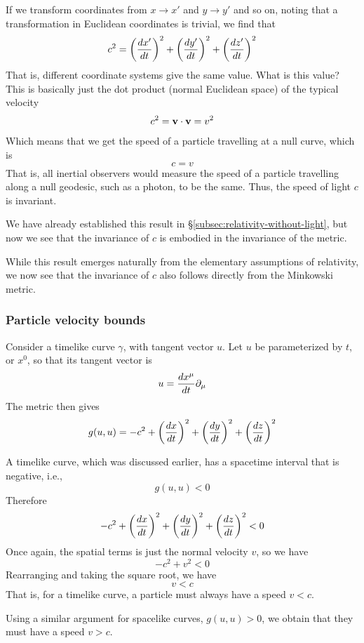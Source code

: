 		If we transform coordinates from $x\to x'$ and $y\to y'$ and so on,
		noting that a transformation in Euclidean coordinates is trivial,
		we find that
		\[
			c^2 = 
			\pqty{
				\dv{x'}{t} 
			}^2
			+
			\pqty{
				\dv{y'}{t} 
			}^2
			+
			\pqty{
				\dv{z'}{t} 
			}^2
		\]
		That is, different coordinate systems give the same value.
		What is this value?
		This is basically just the dot product (normal Euclidean space) of the typical velocity
		\[
			c^2 = \vb{v}\cdot \vb{v} = v^2
		\]
		Which means that we get the speed of a particle travelling 
		at a null curve, which is
		\[
			c = v
		\]
		That is, all inertial observers would measure the speed of a particle
		travelling along a null geodesic, such as a photon, to be the same.
		Thus, the speed of light $c$ is invariant.

		We have already established this result in \S\ref{subsec:relativity-without-light},
		but now we see that the invariance of $c$ is embodied in the invariance
		of the metric.

		While this result emerges naturally from the elementary assumptions
		of relativity, we now see that the invariance of $c$ also follows
		directly from the Minkowski metric.
		
	\subsubsection{Particle velocity bounds}
		\label{subsubsex:particle-velocity-bounds}

		Consider a timelike curve $\gamma$, with tangent vector $u$.
		Let $u$ be parameterized by $t$, or $x^0$, so that its tangent 
		vector is 
		\[
			u = \dv{x^\mu}{t}\partial_\mu 
		\]
		The metric then gives
		\[
			g(u,u) =
			-c^2 
			+
			\pqty{
				\dv{x}{t} 
			}^2
			+
			\pqty{
				\dv{y}{t} 
			}^2
			+
			\pqty{
				\dv{z}{t} 
			}^2
		\]

		A timelike curve, which was discussed earlier, has a spacetime interval
		that is negative, i.e.,
		\[
			g(u,u) < 0
		\]
		Therefore 
		\[
			-c^2 + 
			\pqty{
				\dv{x}{t} 
			}^2
			+
			\pqty{
				\dv{y}{t} 
			}^2
			+
			\pqty{
				\dv{z}{t} 
			}^2
			< 0
		\]
		Once again, the spatial terms is just the normal velocity $v$, so we have
		\[
			- c^2 + v^2 < 0
		\]
		Rearranging and taking the square root, we have
		\[
			v < c
		\]
		That is, for a timelike curve, a particle must always have a speed $v<c$.

		Using a similar argument for spacelike curves, $g(u,u)> 0$, we obtain that they must have
		a speed $v > c$. 
		
